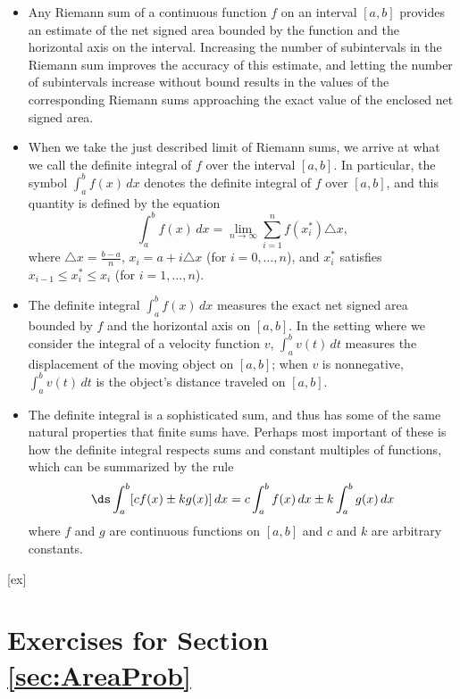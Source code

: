 \begin{itemize}
\item Any Riemann sum of a continuous function $f$ on an interval $[a,b]$ provides an estimate of the net signed area bounded by the function and the horizontal axis on the interval.  Increasing the number of subintervals in the Riemann sum improves the accuracy of this estimate, and letting the number of subintervals increase without bound results in the values of the corresponding Riemann sums approaching the exact value of the enclosed net signed area.
\item When we take the just described limit of Riemann sums, we arrive at what we call the definite integral of $f$ over the interval $[a,b]$.  In particular, the symbol $\int_a^b f(x) \, dx$ denotes the definite integral of $f$ over $[a,b]$, and this quantity is defined by the equation
$$\int_a^b f(x) \, dx = \lim_{n \to \infty} \sum_{i=1}^{n} f(x_i^*) \triangle x,$$
where $\triangle x = \frac{b-a}{n}$, $x_i = a + i\triangle x$ (for $i = 0, \ldots, n$), and $x_i^*$ satisfies $x_{i-1} \le x_i^* \le x_i$ (for $i = 1, \ldots, n$).
\item The definite integral $\int_a^b f(x) \,dx$ measures the exact net signed area bounded by $f$ and the horizontal axis on $[a,b]$.%
In the setting where we consider the integral of a velocity function $v$, $\int_a^b v(t) \,dt$ measures the displacement of the moving object on $[a,b]$; when $v$ is nonnegative, $\int_a^b v(t) \,dt$ is the object's distance traveled on $[a,b]$.  
\item The definite integral is a sophisticated sum, and thus has some of the same natural properties that finite sums have.  Perhaps most important of these is how the definite integral respects sums and constant multiples of functions, which can be summarized by the rule
$$\ds \int_a^b [c f(x) \pm k g(x)] \,dx = c \int_a^b f(x) \,dx \pm k \int_a^b g(x) \,dx$$
where $f$ and $g$ are continuous functions on $[a,b]$ and $c$ and $k$ are arbitrary constants.
\end{itemize}

[ex]
\section*{Exercises for Section \ref{sec:AreaProb}}

